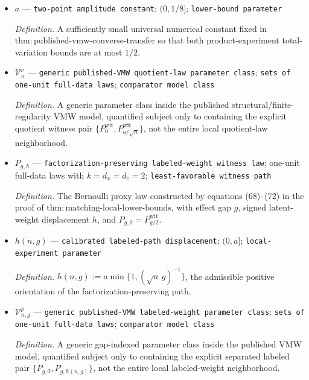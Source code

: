 \documentclass{article}
\begin{document}
\begin{itemize}
  \par\smallskip\noindent\emph{Definition.} The report defined from the explicit center and outer confidence set in \(\mathrm{def:cluster\text{-}report}\).
  \item \(a\) --- \texttt{two-\allowbreak{}point amplitude constant}; \((0,1/8]\); \texttt{lower-\allowbreak{}bound parameter}
  \par\smallskip\noindent\emph{Definition.} A sufficiently small universal numerical constant fixed in \(\mathrm{thm:published\text{-}vmw\text{-}converse\text{-}transfer}\) so that both product-experiment total-variation bounds are at most \(1/2\).
  \item \(\mathcal V_n^\nu\) --- \texttt{generic published-\allowbreak{}VMW quotient-\allowbreak{}law parameter class}; \texttt{sets of one-\allowbreak{}unit full-\allowbreak{}data laws}; \texttt{comparator model class}
  \par\smallskip\noindent\emph{Definition.} A generic parameter class inside the published structural/finite-regularity VMW model, quantified subject only to containing the explicit quotient witness pair \(\{P_0^{\mathrm{wit}},P_{a/\sqrt n}^{\mathrm{wit}}\}\), not the entire local quotient-law neighborhood.
  \item \(P_{g,h}\) --- \texttt{factorization-\allowbreak{}preserving labeled-\allowbreak{}weight witness law}; one-unit full-data laws with \(k=d_x=d_z=2\); \texttt{least-\allowbreak{}favorable witness path}
  \par\smallskip\noindent\emph{Definition.} The Bernoulli proxy law constructed by equations (68)--(72) in the proof of \(\mathrm{thm:matching\text{-}local\text{-}lower\text{-}bounds}\), with effect gap \(g\), signed latent-weight displacement \(h\), and \(P_{g,0}=P_{g/2}^{\mathrm{wit}}\).
  \item \(h(n,g)\) --- \texttt{calibrated labeled-\allowbreak{}path displacement}; \((0,a]\); \texttt{local-\allowbreak{}experiment parameter}
  \par\smallskip\noindent\emph{Definition.} \(h(n,g):=a\min\{1,(\sqrt n\,g)^{-1}\}\), the admissible positive orientation of the factorization-preserving path.
  \item \(\mathcal V_{n,g}^{p}\) --- \texttt{generic published-\allowbreak{}VMW labeled-\allowbreak{}weight parameter class}; \texttt{sets of one-\allowbreak{}unit full-\allowbreak{}data laws}; \texttt{comparator model class}
  \par\smallskip\noindent\emph{Definition.} A generic gap-indexed parameter class inside the published VMW model, quantified subject only to containing the explicit separated labeled pair \(\{P_{g,0},P_{g,h(n,g)}\}\), not the entire local labeled-weight neighborhood.
\end{itemize}
\end{document}
